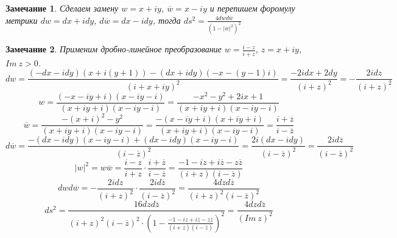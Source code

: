 \documentclass[12pt]{article}
\newcommand\tab[1][.5cm]{\hspace*{#1}}
\theoremstyle{plain}
\newtheorem{remark}{Замечание}
\begin{document}
    \begin{remark}
        Сделаем замену $w=x+iy$, $\overline{w}=x-iy$ и перепишем форомулу метрики $dw=dx+idy$, $d\overline{w}=dx-idy$, тогда $ds^2=\frac{4dwd\overline{w}}{(1-|w|^2)^2}$
    \end{remark}
    \begin{remark}\tab
        Применим дробно-линейное преобразование $w=\frac{i-z}{i+z}$, $z=x+iy$, $Im \ z>0$. 
        $$dw=\frac{(-dx-idy)(x+i(y+1))-(dx+idy)(-x-(y-1)i)}{(i+x+iy)^2}=\frac{-2idx+2dy}{(i+z)^2}=-\frac{2idz}{(i+z)^2}$$
        $$w=\frac{(-x-iy+i)(x-iy-i)}{(x+iy+i)(x-iy-i)}=\frac{-x^2-y^2+2ix+1}{(x+iy+i)(x-iy-i)}$$
        $$\overline{w}=\frac{-(x+i)^2-y^2}{(x+iy+i)(x-iy-i)}=\frac{-(x-iy+i)(x+iy+i)}{(x+iy+i)(x-iy-i)}=\frac{i+\overline{z}}{i-\overline{z}}$$
        $$d\overline{w}=\frac{-(dx-idy)(x-iy-i)+(dx-idy)(x-iy-i)}{(i-\overline{z})^2}=\frac{2i(dx-idy)}{(i-\overline{z})^2}=\frac{2id\overline{z}}{(i-\overline{z})^2}$$
        $$|w|^2=w\overline{w}=\frac{i-z}{i+z}\cdot\frac{i+\overline{z}}{i-\overline{z}}=\frac{-1-iz+i\overline{z}-z\overline{z}}{(i+z)(i-\overline{z})}$$
        $$dwd\overline{w}=-\frac{2idz}{(i+z)^2}\cdot\frac{2id\overline{z}}{(i-\overline{z})^2}=\frac{4dzd\overline{z}}{(i+z)^2(i-\overline{z})^2}$$
        $$ds^2=\frac{16dzd\overline{z}}{(i+z)^2(i-\overline{z})^2\cdot\left(1-\frac{-1-iz+i\overline{z}-z\overline{z}}{(i+z)(i-\overline{z})}\right)^2}=\frac{4dzd\overline{z}}{(Im \ z)^2}$$
    \end{remark}
\end{document}
